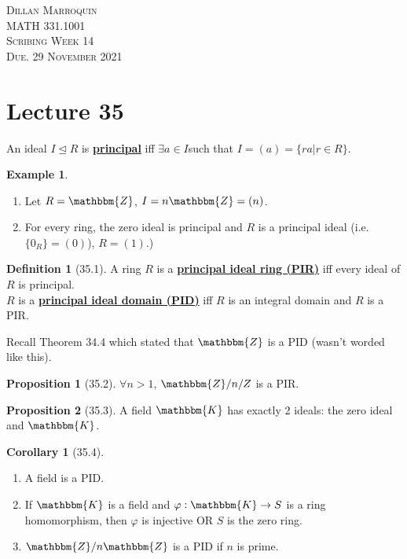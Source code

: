 \documentclass{article}
\newcommand{\Z}{\mathbbm{Z}}
\newcommand{\define}[1]{\textbf{\underline{#1}}}
\newcommand{\func}[3]{#1: #2 \to #3}
\theoremstyle{definition}
\newtheorem*{defn}{Definition}
\newtheorem*{cor}{Corollary}
\newtheorem*{prop}{Proposition}
\newtheorem*{ex}{Example}
\theoremstyle{remark}
\newcommand{\ideal}{\unlhd}
\newcommand{\K}{\mathbbm{K}}
\begin{document}
    \begin{center}
        \textsc{Dillan Marroquin\\MATH 331.1001\\Scribing Week 14\\Due. 29 November 2021\\}
    \end{center}
        
    \section*{Lecture 35}{
        An ideal $I \ideal R$ is \define{principal} iff $\exists a \in I$such that $I=(a)=\{ra|r\in R\}$.
        
        \begin{ex}
            \begin{enumerate}
                \item Let $R=\Z$, $I=n\Z=(n)$.
                \item For every ring, the zero ideal is principal and $R$ is a principal ideal (i.e. $\{0_R\}=(0)$), $R=(1)$.)
            \end{enumerate}
        \end{ex}
        
        \begin{defn}[35.1]
            A ring $R$ is a \define{principal ideal ring (PIR)} iff every ideal of $R$ is principal.\\
            $R$ is a \define{principal ideal domain (PID)} iff $R$ is an integral domain and $R$ is a PIR.
        \end{defn}
        
        Recall Theorem 34.4 which stated that $\Z$ is a PID (wasn't worded like this).
        
        \begin{prop}[35.2]
            $\forall n>1$, $\Z/n/Z$ is a PIR.
        \end{prop}
        
        \begin{prop}[35.3]
            A field $\K$ has exactly 2 ideals: the zero ideal and $\K$.
        \end{prop}
        
        \begin{cor}[35.4]
            \begin{enumerate}
                \item A field is a PID.
                \item If $\K$ is a field and $\func{\varphi}{\K}{S}$ is a ring homomorphism, then $\varphi$ is injective OR $S$ is the zero ring.
                \item $\Z/n\Z$ is a PID if $n$ is prime.
            \end{enumerate}
        \end{cor}
        
}
\end{document}
